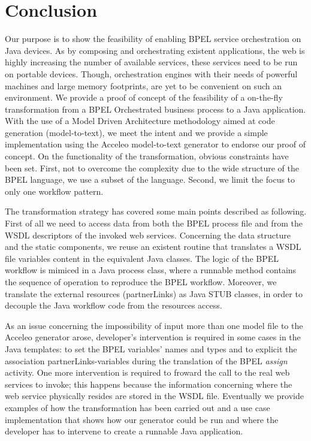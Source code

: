 \section{Conclusion}
\label{Conclusion}
Our purpose is to show the feasibility of enabling BPEL service orchestration on Java devices. As by composing and orchestrating existent applications, the web is highly increasing the number of available services, these services need to be run on portable devices. Though, orchestration engines with their needs of powerful machines and large memory footprints, are yet to be convenient on such an environment.
We provide a proof of concept of the feasibility of a on-the-fly transformation from a BPEL Orchestrated business process to a Java application. 
With the use of a Model Driven Architecture methodology aimed at code generation (model-to-text), we meet the intent and we provide a simple implementation using the Acceleo model-to-text generator to endorse our proof of concept.
On the functionality of the transformation, obvious constraints have been set. First, not to overcome the complexity due to the wide structure of the BPEL language, we use a subset of the language. Second, we limit the focus to only one workflow pattern.
\par\vspace{7mm}

The transformation strategy has covered some main points described as following. First of all we need to access data from both the BPEL process file and from the WSDL descriptors of the invoked web services. 
Concerning the data structure and the static components, we reuse an existent routine that translates a WSDL file variables content in the equivalent Java classes. 
The logic of the BPEL workflow is mimiced in a Java process class, where a runnable method contains the sequence of operation to reproduce the BPEL workflow.
Moreover, we translate the external resources (partnerLinks) as Java STUB classes, in order to decouple the Java workflow code from the resources access.
\par\vspace{7mm}

As an issue concerning the impossibility of input more than one model file to the Acceleo generator arose, developer's intervention is required in some cases in the Java templates: to set the BPEL variables' names and types and to explicit the association partnerLinks-variables during the translation of the BPEL \textit{assign} activity. One more intervention is required to froward the call to the real web services to invoke; this happens because the information concerning where the web service physically resides are stored in the WSDL file.
Eventually we provide examples of how the transformation has been carried out and a use case implementation that shows how our generator could be run and where the developer has to intervene to create a runnable Java application. 
\par\vspace{7mm}

